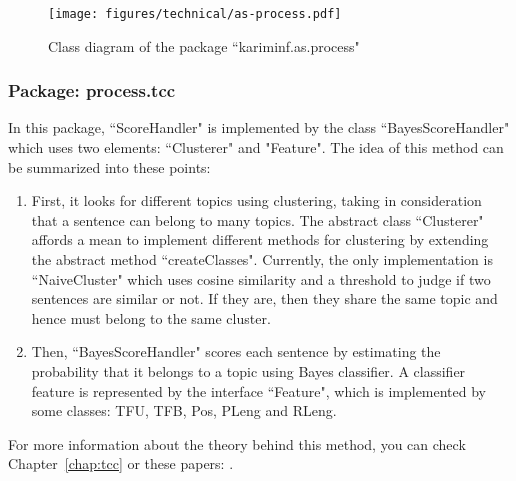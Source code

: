 \begin{figure}[!ht]
	\begin{center}
		\texttt{[image: figures/technical/as-process.pdf]}
	\end{center}
	\caption{\label{fig:as-process} Class diagram of the package ``kariminf.as.process"}
\end{figure}

\subsubsection{Package: process.tcc}

In this package, ``ScoreHandler" is implemented by the class ``BayesScoreHandler" which uses two elements: ``Clusterer" and "Feature". 
The idea of this method can be summarized into these points:
\begin{enumerate}
	\item First, it looks for different topics using clustering, taking in consideration that a sentence can belong to many topics. 
	The abstract class ``Clusterer" affords a mean to implement different methods for clustering by extending the abstract method ``createClasses". 
	Currently, the only implementation is ``NaiveCluster" which uses cosine similarity and a threshold to judge if two sentences are similar or not. 
	If they are, then they share the same topic and hence must belong to the same cluster. 
	
	\item Then, ``BayesScoreHandler" scores each sentence by estimating the probability that it belongs to a topic using Bayes classifier. 
	A classifier feature is represented by the interface ``Feature", which is implemented by some classes: TFU, TFB, Pos, PLeng and RLeng.
	
\end{enumerate}
For more information about the theory behind this method, you can check Chapter~\ref{chap:tcc} or these papers: \citep{13-aries-al,15-aries-al}.


